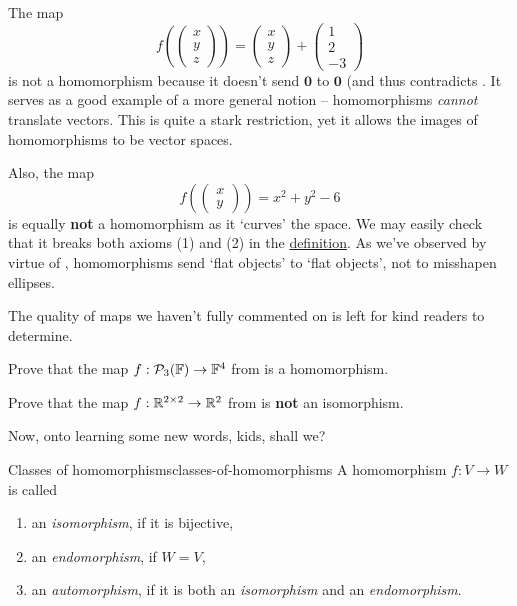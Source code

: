 The map
\[
 f \left( 
 \begin{pmatrix}
  x\\
  y\\
  z
 \end{pmatrix}
 \right) = 
 \begin{pmatrix}
  x\\
  y\\
  z
 \end{pmatrix}
 +
 \begin{pmatrix}
  1\\
  2\\
  -3
 \end{pmatrix}
\]
is not a homomorphism because it doesn't send $\mathbf{0}$ to $\mathbf{0}$ (and
thus contradicts . It serves as a good example of
a more general notion -- homomorphisms \emph{cannot} translate vectors. This is
quite a stark restriction, yet it allows the images of homomorphisms to be
vector spaces.

Also, the map
\[
 f \left( 
  \begin{pmatrix}
   x\\
   y
  \end{pmatrix}
 \right) = x^2 + y^2 - 6
\]
is equally \textbf{not} a homomorphism as it `curves' the space. We may easily
check that it breaks both axioms (1) and (2) in the
\hyperref[def:homomorphism]{definition}. As we've observed by virtue of
, homomorphisms send `flat objects' to
`flat objects', not to misshapen ellipses.

The quality of maps we haven't fully commented on is left for kind readers to
determine.

\begin{exercise}{}{}
 Prove that the map $f:\mathcal{P}_3(\mathbb{F}) \to \mathbb{F}^{4}$ from
  is a homomorphism.
\end{exercise}

\begin{exercise}{}{}
 Prove that the map $f:\mathbb{R}^{2 \times 2} \to \mathbb{R}^2$ from 
 is \textbf{not} an isomorphism.
\end{exercise}

Now, onto learning some new words, kids, shall we?

\begin{definition}{Classes of homomorphisms}{classes-of-homomorphisms}
 A homomorphism $f:V \to W$ is called
 \begin{enumerate}
  \item an \emph{isomorphism}, if it is bijective,
  \item an \emph{endomorphism}, if $W = V$,
  \item an \emph{automorphism}, if it is both an \emph{isomorphism} and an
   \emph{endomorphism}.
 \end{enumerate}
\end{definition}

